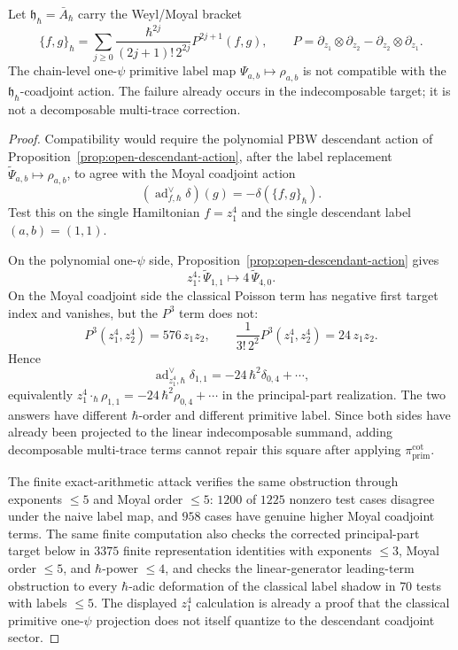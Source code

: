 \begin{prop}
  \label{prop:quantum-descendant-label-obstruction}
  Let \(\mathfrak h_\hbar=\bar A_\hbar\) carry the Weyl/Moyal bracket
  \[
    \{f,g\}_\hbar
    =
    \sum_{j\geq0}
    \frac{\hbar^{2j}}{(2j+1)!\,2^{2j}}P^{2j+1}(f,g),
    \qquad
    P=\partial_{z_1}\otimes\partial_{z_2}
      -\partial_{z_2}\otimes\partial_{z_1}.
  \]
  The chain-level one-\(\psi\) primitive label map
  \(\Psi_{a,b}\mapsto\rho_{a,b}\) is not compatible with the
  \(\mathfrak h_\hbar\)-coadjoint action.  The failure already occurs in
  the indecomposable target; it is not a decomposable multi-trace
  correction.
\end{prop}

\begin{proof}
  Compatibility would require the polynomial PBW descendant action
  of Proposition~\ref{prop:open-descendant-action}, after the label
  replacement \(\widetilde\Psi_{a,b}\mapsto\rho_{a,b}\), to agree with
  the Moyal coadjoint action
  \[
    (\operatorname{ad}^{\vee}_{f,\hbar}\delta)(g)
    =-\delta(\{f,g\}_\hbar).
  \]
  Test this on the single Hamiltonian \(f=z_1^4\) and the single
  descendant label \((a,b)=(1,1)\).

  On the polynomial one-\(\psi\) side,
  Proposition~\ref{prop:open-descendant-action} gives
  \[
    z_1^4:\widetilde\Psi_{1,1}
    \longmapsto 4\,\widetilde\Psi_{4,0}.
  \]
  On the Moyal coadjoint side the classical Poisson term has negative
  first target index and vanishes, but the \(P^3\) term does not:
  \[
    P^3(z_1^4,z_2^4)=576\,z_1z_2,\qquad
    \frac{1}{3!\,2^2}P^3(z_1^4,z_2^4)=24\,z_1z_2.
  \]
  Hence
  \[
    \operatorname{ad}^{\vee}_{z_1^4,\hbar}\delta_{1,1}
    =-24\,\hbar^2\delta_{0,4}+\cdots,
  \]
  equivalently
  \(z_1^4\cdot_\hbar\rho_{1,1}=-24\,\hbar^2\rho_{0,4}+\cdots\) in the
  principal-part realization.  The two answers have different
  \(\hbar\)-order and different primitive label.  Since both sides have
  already been projected to the linear indecomposable summand, adding
  decomposable multi-trace terms cannot repair this square after
  applying \(\pi_{\mathrm{prim}}^{\mathrm{cot}}\).

	  The finite exact-arithmetic attack verifies the same
	  obstruction through exponents \(\leq5\) and Moyal order \(\leq5\):
  \(1200\) of \(1225\) nonzero test cases disagree under the naive label
  map, and \(958\) cases have genuine higher Moyal coadjoint terms.  The
  same finite computation also checks the corrected principal-part target below in
  \(3375\) finite representation identities with exponents \(\leq3\),
  Moyal order \(\leq5\), and \(\hbar\)-power \(\leq4\), and checks the
	  linear-generator leading-term obstruction to every \(\hbar\)-adic
	  deformation of the classical label shadow in \(70\) tests with
  labels \(\leq5\).
  The displayed \(z_1^4\) calculation is already a proof that the
  classical primitive one-\(\psi\) projection does not itself quantize
  to the descendant coadjoint sector.
\end{proof}

